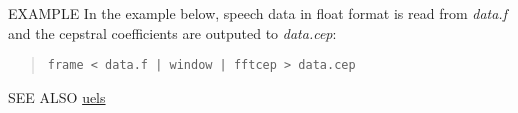 \begin{options}
\end{options}

\begin{qsection}{EXAMPLE}
In the example below, speech data in float format is read from
{\em data.f} and the cepstral coefficients are outputed to {\em data.cep}:
\begin{quote}
  \verb!frame < data.f | window | fftcep > data.cep !
\end{quote}
\end{qsection}

\begin{qsection}{SEE ALSO}
\hyperlink{uels}{uels}
\end{qsection}
